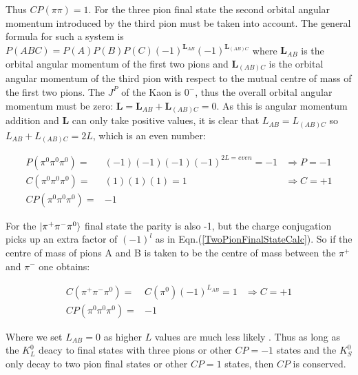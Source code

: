 \noindent Thus ${C}{P} (\pi \pi) = 1$. For the three pion final state the second orbital angular momentum introduced by the third pion must be taken into account. The general formula for such a system is ${P} (ABC) = {P} (A) {P} (B) {P}(C) (-1)^{\mathbf{L}_{AB}} (-1)^{\mathbf{L}_{(AB)C}}$ where $\mathbf{L}_{AB}$ is the orbital angular momentum of the first two pions and $\mathbf{L}_{(AB)C}$ is the orbital angular momentum of the third pion with respect to the mutual centre of mass of the first two pions. The $J^{P}$ of the Kaon is $0^{-}$, thus the overall orbital angular momentum must be zero: $\mathbf{L} = \mathbf{L}_{AB} + \mathbf{L}_{(AB)C} = 0$. As this is angular momentum addition and $\mathbf{L}$ can only take positive values, it is clear that ${L}_{AB} = {L}_{(AB)C}$ so ${L}_{AB} + {L}_{(AB)C} = 2L$, which is an even number: 

\begin{align*}
P(\pi^0 \pi^0 \pi^0)  = & (-1)(-1)(-1)(-1)^{2L = even} = -1 & \Rightarrow P = -1 \\
C(\pi^0 \pi^0 \pi^0)  = & (1)(1)(1) = 1                     & \Rightarrow C = +1 \\
CP(\pi^0 \pi^0 \pi^0) = & -1                                &
\end{align*}

\noindent For the $\ket{\pi^+ \pi^- \pi^0}$ final state the parity is also -1, but the charge conjugation picks up an extra factor of $(-1)^{l}$ as in Eqn.(\ref{TwoPionFinalStateCalc}). So if the centre of mass of pions A and B is taken to be the centre of mass between the $\pi^{+}$ and $\pi^{-}$ one obtains:

\begin{align*}
C(\pi^+ \pi^- \pi^0)  = & C(\pi^{0})(-1)^{{L}_{AB}} = 1     & \Rightarrow C = +1 \\
CP(\pi^0 \pi^0 \pi^0) = & -1                                &
\end{align*}
 
\noindent Where we set ${L}_{AB} = 0$ as higher $L$ values are much less likely \cite{Nakada}. Thus as long as the $K^{0}_{L}$ deacy to final states with three pions or other $CP = -1$ states and the $K^{0}_{S}$ only decay to two pion final states or other $CP = 1$ states, then $CP$ is conserved.

